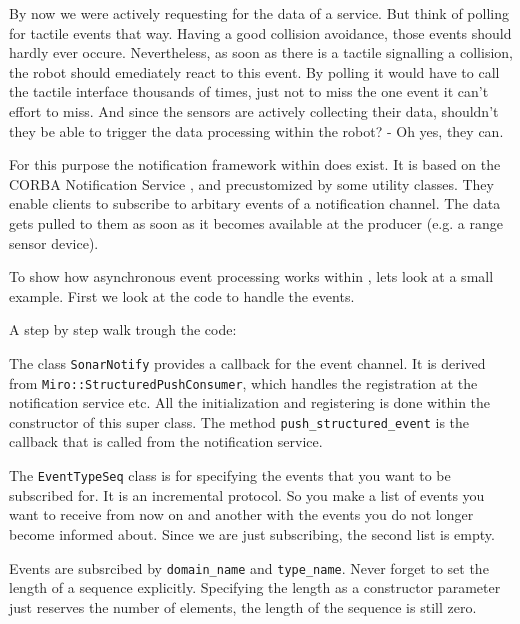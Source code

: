By now we were actively requesting for the data of a service. But
think of polling for tactile events that way. Having a good collision
avoidance, those events should hardly ever occure. Nevertheless, as
soon as there is a tactile signalling a collision, the robot should
emediately react to this event. By polling it would have to call the
tactile interface thousands of times, just not to miss the one event
it can't effort to miss. And since the sensors are actively collecting
their data, shouldn't they be able to trigger the data processing
within the robot? - Oh yes, they can.

For this purpose the notification framework within \miro does
exist. It is based on the CORBA Notification Service \cite{OMG:00-5},
and precustomized by some utility classes. They enable clients to
subscribe to arbitary events of a notification channel. The data gets
pulled to them as soon as it becomes available at the producer (e.g. a
range sensor device).

To show how asynchronous event processing works within \miro, lets
look at a small example. First we look at the code to handle the
events.



A step by step walk trough the code:



The class \lstinline!SonarNotify! provides a callback for the event
channel. It is derived from \lstinline!Miro::StructuredPushConsumer!,
which handles the registration at the notification service etc. All
the initialization and registering is done within the constructor of
this super class. The method \lstinline!push_structured_event! is the
callback that is called from the notification service.



The \lstinline!EventTypeSeq! class is for specifying the events that you
want to be subscribed for. It is an incremental protocol. So you make
a list of events you want to receive from now on and another with the
events you do not longer become informed about. Since we are just
subscribing, the second list is empty.



Events are subsrcibed by \lstinline!domain_name! and
\lstinline!type_name!. Never forget to set the length of a sequence
explicitly. Specifying the length as a constructor parameter just
reserves the number of elements, the length of the sequence is still
zero.

